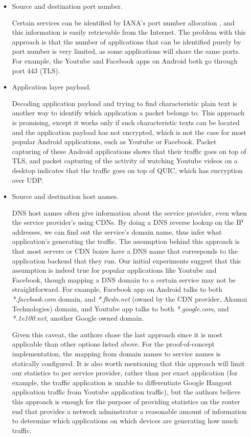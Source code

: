 \begin{itemize}
\begin{itemize}
  \item Source and destination port number. 

  Certain services can be identified by IANA's port number allocation \cite{PortAssignment}, and this information is easily retrievable from the Internet. The problem with this approach is that the number of applications that can be identified purely by port number is very limited, as some applications will share the same ports. For example, the Youtube and Facebook apps on Android both go through port 443 (TLS).

  \item Application layer payload. 

  Decoding application payload and trying to find characteristic plain text is another way to identify which application a packet belongs to. This approach is promising, except it works only if such characteristic texts can be located and the application payload has not encrypted, which is not the case for most popular Android applications, such as Youtube or Facebook. Packet capturing of these Android applications shows that their traffic goes on top of TLS, and packet capturing of the activity of watching Youtube videos on a desktop indicates that the traffic goes on top of QUIC, which has encryption over UDP.

  \item Source and destination host names. 

  DNS host names often give information about the service provider, even when the service provider's using CDNs. By doing a DNS reverse lookup on the IP addresses, we can find out the service's domain name, thus infer what application's generating the traffic. The assumption behind this approach is that most servers or CDN boxes have a DNS name that corresponds to the application backend that they run. Our initial experiments suggest that this assumption is indeed true for popular applications like Youtube and Facebook, though mapping a DNS domain to a certain service may not be straightforward. For example, Facebook app on Android talks to both \textit{*.facebook.com} domain, and \textit{*.fbcdn.net} (owned by the CDN provider, Akamai Technologies) domain, and Youtube app talks to both \textit{*.google.com}, and \textit{*.1e100.net}, another Google owned domain. 

  Given this caveat, the authors chose the last approach since it is most applicable than other options listed above. For the proof-of-concept implementation, the mapping from domain names to service names is statically configured. It is also worth mentioning that this approach will limit our statistics to per service provider, rather than per exact application (for example, the traffic application is unable to differentiate Google Hangout application traffic from Youtube application traffic), but the authors believe this approach is enough for the purpose of providing statistics on the router end that provides a network adminstrator a reasonable amount of information to determine which applications on which devices are generating how much traffic.


\end{itemize}
\end{itemize}
